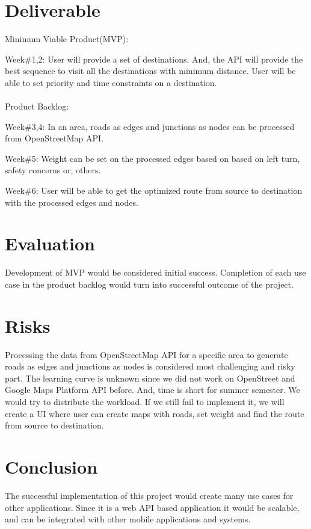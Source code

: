 \documentclass{article}
\begin{document}
\section{Deliverable}
Minimum Viable Product(MVP):

Week\#1,2: User will provide a set of destinations. And, the API will provide the best sequence to visit all the destinations with minimum distance. User will be able to set priority and time constraints on a destination.
\\
\\
Product Backlog:

Week\#3,4: In an area, roads as edges and junctions as nodes can be processed from OpenStreetMap API.

Week\#5: Weight can be set on the processed edges based on based on left turn, safety concerns or, others.

Week\#6: User will be able to get the optimized route from source to destination with the processed edges and nodes.

\section{Evaluation}
Development of MVP would be considered initial success. Completion of each use case in the product backlog would turn into successful outcome of the project.

\section{Risks}
Processing the data from OpenStreetMap API for a specific area to generate roads as edges and junctions as nodes is considered most challenging and risky part. The learning curve is unknown since we did not work on OpenStreet and Google Maps Platform API before. And, time is short for summer semester. We would try to distribute the workload. If we still fail to implement it, we will create a UI where user can create maps with roads, set weight and find the route from source to destination.

\section{Conclusion}
The successful implementation of this project would create many use cases for other applications. Since it is a web API based application it would be scalable, and can be integrated with other mobile applications and systems.


\end{document}
